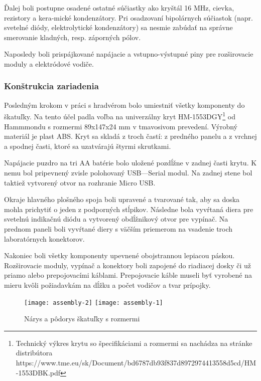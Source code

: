 \documentclass[titlepage,12pt]{article}
\begin{document}
Ďalej boli postupne osadené ostatné súčiastky ako kryštál 16 MHz, cievka, rezistory a kera-mické kondenzátory. Pri osadzovaní bipolárnych súčiastok (napr. svetelné diódy, elektrolytické kondenzátory) sa nesmie zabúdať na správne smerovanie kladných, resp. záporných pólov.

Naposledy boli prispájkované napájacie a vstupno-výstupné piny pre rozširovacie moduly \linebreak a elektródové vodiče.

\newpage
\subsubsection{Konštrukcia zariadenia}
Posledným krokom v práci s hradvérom bolo umiestniť všetky komponenty do škatuľky. Na tento účel padla voľba na univerzálny kryt HM-1553DGY\footnote{Technický výkres krytu so špecifikáciami a rozmermi sa nachádza na stránke distribútora \\ https://www.tme.eu/sk/Document/bd6787db93f837d8972974413558d5cd/HM-1553DBK.pdf} od Hammmondu s rozmermi \linebreak 89x147x24 mm v tmavosivom prevedení. Výrobný materiál je plast ABS. Kryt sa skladá \linebreak z troch častí: z predného panelu a z vrchnej a spodnej časti, ktoré sa uzatvárajú štyrmi skrutkami. 

Napájacie puzdro na tri AA batérie bolo uložené pozdĺžne v zadnej časti krytu. K nemu bol pripevnený zvisle polohovaný USB—Serial modul. Na zadnej stene bol taktiež vytvorený otvor na rozhranie Micro USB.

Okraje hlavného plošného spoja boli upravené a tvarované tak, aby sa doska mohla prichytiť o jeden z podporných stĺpikov. Následne bola vyvŕtaná diera pre svetelnú indikačnú diódu \linebreak a vytvorený obdĺžnikový otvor pre vypínač. Na prednom paneli boli vyvŕtané diery s väčším priemerom na vsadenie troch laboratórnych konektorov.

Nakoniec boli všetky komponenty upevnené obojstrannou lepiacou páskou. Rozširovacie moduly, vypínač a konektory boli zapojené do riadiacej dosky či už priamo alebo prepojovacími káblami. Prepojovacie káble museli byť vyrobené na mieru kvôli požiadavkám na dĺžku a počet vodičov a tvar prípojky.


\begin{figure}[!ht]
\begin{center}
\texttt{[image: assembly-2]}
\texttt{[image: assembly-1]}
\caption{Nárys a pôdorys škatuľky s rozmermi}
\end{center}
\end{figure}
\end{document}
